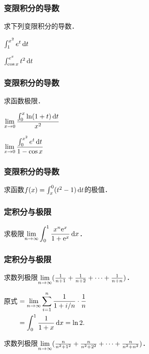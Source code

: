 \documentclass[14pt,notheorems,leqno,xcolor={rgb}]{beamer} %
\begin{document}
\begin{oframe}
\frametitle{变限积分的导数}
\begin{review}
求下列变限积分的导数．
\begin{enumlite}
\item $\int_1^{x^2} e^t \mathop{}\!\mathrm{d}{t}$
\item $\int_{\cos x}^{e^x} t^2\mathop{}\!\mathrm{d}{t}$
\end{enumlite}
\end{review}
\end{oframe}

\begin{frame}
\frametitle{变限积分的导数}
\begin{review}
求函数极限．
\begin{enumlite}
  \item $\displaystyle \lim_{x\to0}\frac{\int_0^x\ln(1+t)\mathop{}\!\mathrm{d}{t}}{x^2}$
  \item $\displaystyle \lim_{x\to0}\frac{\int_0^{x^2}e^t\mathop{}\!\mathrm{d}{t}}{1-\cos x}$
\end{enumlite}
\end{review}
\end{frame}

\begin{oframe}
\frametitle{变限积分的导数}
\begin{review}
求函数$f(x)=\int_x^0(t^2-1)\mathop{}\!\mathrm{d} t$的极值．
\end{review}
\end{oframe}

\begin{frame}
\frametitle{定积分与极限}
\begin{puzzle}
求极限$\displaystyle\lim\limits_{n\to\infty}\int_0^1\frac{x^n\mathrm{e}^x}{1+\mathrm{e}^x}\mathop{}\!\mathrm{d} x$．
\end{puzzle}
\end{frame}

\begin{iframe}
\frametitle{定积分与极限}
\begin{puzzle}
求数列极限$\lim\limits_{n\to\infty}(\frac1{n+1}+\frac1{n+2}+\cdots+\frac{1}{n+n})$．
\end{puzzle}
\vpause
\begin{solution}
原式\unskip$\begin{aligned}[t]
&=\lim\limits_{n\to\infty}\sum_{i=1}^{n}\frac1{1+i/n}\cdot\frac1n\\
&=\int_0^1 \frac1{1+x}\mathop{}\!\mathrm{d}{x}=\ln2.
\end{aligned}$
\end{solution}
\vpause
\begin{thinking}
求数列极限$\lim\limits_{n\to\infty}(\frac{n}{n^2+1^2}+\frac{n}{n^2+2^2}+\cdots+\frac{n}{n^2+n^2})$．
\end{thinking}
\end{iframe}
\end{document}
